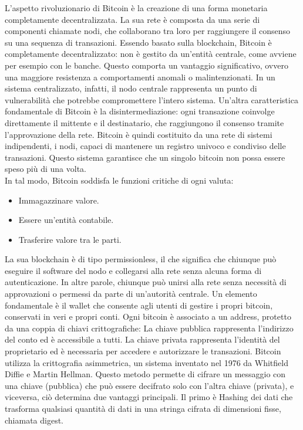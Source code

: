 L’aspetto rivoluzionario di Bitcoin è la creazione di una forma monetaria completamente decentralizzata. La sua rete è composta da una serie di componenti chiamate nodi, che collaborano tra loro per raggiungere il consenso su una sequenza di transazioni.
Essendo basato sulla blockchain, Bitcoin è completamente decentralizzato: non è gestito da un’entità centrale, come avviene per esempio con le banche. Questo comporta un vantaggio significativo, ovvero una maggiore resistenza a comportamenti anomali o malintenzionati. In un sistema centralizzato, infatti, il nodo centrale rappresenta un punto di vulnerabilità che potrebbe compromettere l’intero sistema.
Un’altra caratteristica fondamentale di Bitcoin è la disintermediazione: ogni transazione coinvolge direttamente il mittente e il destinatario, che raggiungono il consenso tramite l’approvazione della rete. Bitcoin è quindi costituito da una rete di sistemi indipendenti, i nodi, capaci di mantenere un registro univoco e condiviso delle transazioni. Questo sistema garantisce che un singolo bitcoin non possa essere speso più di una volta.\\
In tal modo, Bitcoin soddisfa le funzioni critiche di ogni valuta:
\begin{itemize}
\item Immagazzinare valore.
\item Essere un’entità contabile.
\item Trasferire valore tra le parti.
\end{itemize}
La sua blockchain è di tipo permissionless, il che significa che chiunque può eseguire il software del nodo e collegarsi alla rete senza alcuna forma di autenticazione. In altre parole, chiunque può unirsi alla rete senza necessità di approvazioni o permessi da parte di un’autorità centrale.
Un elemento fondamentale è il wallet che consente agli utenti di gestire i propri bitcoin, conservati in veri e propri conti. Ogni bitcoin è associato a un address, protetto da una coppia di chiavi crittografiche:
La chiave pubblica rappresenta l’indirizzo del conto ed è accessibile a tutti.
La chiave privata rappresenta l’identità del proprietario ed è necessaria per accedere e autorizzare le transazioni.
Bitcoin utilizza la crittografia asimmetrica, un sistema inventato nel 1976 da Whitfield Diffie e Martin Hellman. Questo metodo permette di cifrare un messaggio con una chiave (pubblica) che può essere decifrato solo con l’altra chiave (privata), e viceversa, ciò determina due vantaggi principali.
Il primo è Hashing dei dati che trasforma qualsiasi quantità di dati in una stringa cifrata di dimensioni fisse, chiamata digest.\\
